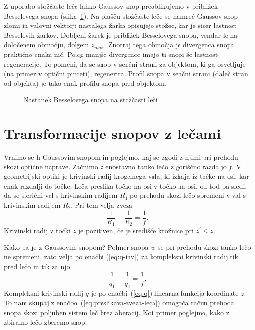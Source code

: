 \begin{remark}
Z uporabo stožčaste leče lahko Gaussov snop
preoblikujemo v približek Besselovega snopa (slika~\ref{fig:Bessel_leca}). 
Na plašču stožčaste leče se namreč Gaussov snop zlomi in valovni vektorji 
nastalega žarka opisujejo stožec, kar je sicer lastnost Besselovih žarkov.
Dobljeni žarek je približek Besselovega snopa, vendar le na določenem območju, dolgem $z_{max}$.
Znotraj tega območja je divergenca snopa praktično enaka nič. Poleg manjše divergence
imajo ti snopi še lastnost regeneracije. To pomeni, da se snop v senčni strani
za objektom, ki ga osvetljuje (na primer v optični pinceti), regenerira. 
Profil snopa v senčni strani (daleč stran od objekta) je tako enak profilu 
snopa pred objektom. 
\begin{figure}[h]
\centering
\def\svgwidth{100truemm} 

\caption{Nastanek Besselovega snopa na stožčasti leči}
\label{fig:Bessel_leca}
\end{figure}
\end{remark}

\section{Transformacije snopov z lečami}

Vrnimo se h Gaussovim snopom in poglejmo, kaj se zgodi z njimi pri prehodu
skozi optične naprave. Začnimo
z enostavno tanko lečo z goriščno razdaljo $f$. V geometrijski optiki
je krivinski radij krogelnega vala, ki izhaja iz točke na osi, kar
enak razdalji do točke. Leča preslika točko na osi v točko na osi,
od tod pa sledi, da se sferični val s krivinskim radijem $R_{1}$
po prehodu skozi lečo spremeni v val s krivinskim radijem $R_{2}$.
Pri tem velja zveza 
\begin{equation}
\frac{1}{R_{1}}-\frac{1}{R_{2}}=\frac{1}{f}.
\end{equation}
Krivinski radij v točki $z$ je pozitiven, če je središče krožnice pri $z^{\prime}\le z$.

Kako pa je z Gaussovim snopom? Polmer snopa $w$ se pri prehodu 
skozi tanko lečo ne spremeni, zato velja po enačbi (\ref{eq:q-inv}) za
kompleksni krivinski radij tik pred lečo in tik za njo
\begin{equation}
\frac{1}{q_{1}}-\frac{1}{q_{2}}=\frac{1}{f}.
\label{eq:preslikava-zveza-leca}
\end{equation}
Kompleksni krivinski radij $q$ je po enačbi~(\ref{eq:q}) linearna funkcija koordinate $z$.
To nam skupaj z enačbo~(\ref{eq:preslikava-zveza-leca})
omogoča račun prehoda snopa skozi poljuben sistem leč brez aberacij.
Kot primer poglejmo, kako z zbiralno lečo zberemo snop.

